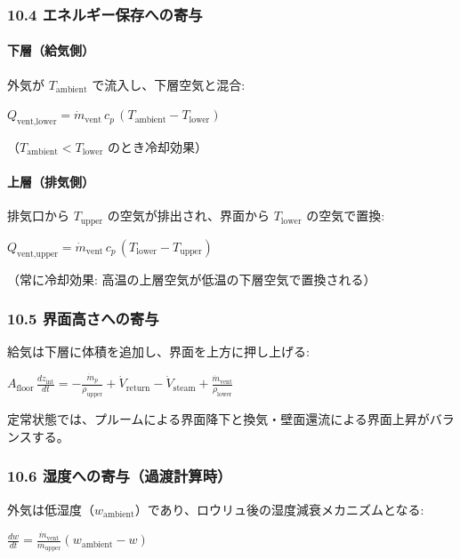 \documentclass[a4paper,11pt]{article}
\begin{document}
\subsubsection{10.4 エネルギー保存への寄与}

\paragraph{下層（給気側）}

外気が $T_{\text{ambient}}$ で流入し、下層空気と混合:

$
Q_{\text{vent,lower}} = \dot{m}_{\text{vent}} \, c_p \, (T_{\text{ambient}} - T_{\text{lower}})
$

（$T_{\text{ambient}} < T_{\text{lower}}$ のとき冷却効果）

\paragraph{上層（排気側）}

排気口から $T_{\text{upper}}$ の空気が排出され、界面から $T_{\text{lower}}$ の空気で置換:

$
Q_{\text{vent,upper}} = \dot{m}_{\text{vent}} \, c_p \, (T_{\text{lower}} - T_{\text{upper}})
$

（常に冷却効果: 高温の上層空気が低温の下層空気で置換される）

\subsubsection{10.5 界面高さへの寄与}

給気は下層に体積を追加し、界面を上方に押し上げる:

$
A_{\text{floor}} \, \frac{dz_{\text{int}}}{dt}
= -\frac{\dot{m}_p}{\rho_{\text{upper}}} + \dot{V}_{\text{return}} - \dot{V}_{\text{steam}}
+ \frac{\dot{m}_{\text{vent}}}{\rho_{\text{lower}}}
$

定常状態では、プルームによる界面降下と換気・壁面還流による界面上昇がバランスする。

\subsubsection{10.6 湿度への寄与（過渡計算時）}

外気は低湿度（$w_{\text{ambient}}$）であり、ロウリュ後の湿度減衰メカニズムとなる:

$
\frac{dw}{dt} = \frac{\dot{m}_{\text{vent}}}{m_{\text{upper}}} (w_{\text{ambient}} - w)
$
\end{document}
